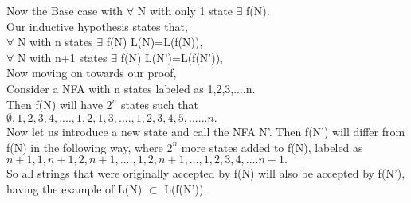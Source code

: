 \documentclass[a4paper]{exam}
\begin{document}
\begin{questions}
\begin{solution}
    Now the Base case with $\forall$ N with only 1 state $\exists$ f(N).\\
    
    Our inductive hypothesis states that,\\
    $\forall$ N with n states $\exists$ f(N) L(N)=L(f(N)),\\
    $\forall$ N with n+1 states $\exists$ f(N) L(N')=L(f(N')),\\
    
    Now moving on towards our proof,\\
    Consider a NFA with n states labeled as 1,2,3,....n.\\
    Then f(N) will have $2^{n}$ states such that  $\emptyset,{1},{2},{3},{4},....,{1,2},{1,3},....,{1,2,3,4,5,......n}.$\\
    
    Now let us introduce a new state and call the NFA N'. Then f(N') will differ from f(N) in the following way, where $2^{n}$ more states added to f(N), labeled as\\
    ${n+1},{1,n+1},{2,n+1},....,{1,2,n+1},...,{1,2,3,4,....n+1}.$\\
    
    So all strings that were originally accepted by f(N) will also be accepted by f(N'), having the example of L(N) $\subset$ L(f(N')).\\
    
  \end{solution}
\end{questions}
\end{document}
